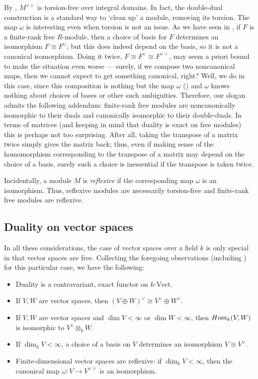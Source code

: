 By , $M^{\vee\vee}$ is
torsion-free over integral domains. In
fact, the double-dual construction is a standard way to `clean up' a
module, removing its torsion.  The map $\omega$ is interesting even
when torsion is not an issue. As we have seen in
, if $F$ is a finite-rank free $R$-module,
then a choice of basis for $F$ determines an isomorphism
$F \cong F^\vee$; but this does indeed depend on the basis, so it is
not a canonical isomorphism. Doing it twice,
$F \cong F^\vee \cong F^{\vee\vee}$, may seem a priori bound to make
the situation even worse --- surely, if we compose two noncanonical
maps, then we cannot expect to get something canonical, right? Well,
we do in this case, since this composition is nothing but the map
$\omega$
()
and $\omega$ knows nothing about choices of bases or other such
ambiguities. Therefore, our slogan admits the following addendum:
finite-rank free modules are noncanonically isomorphic to their duals
and canonically isomorphic to their double-duals.  In terms of
matrices (and keeping in mind that duality is exact on free modules)
this is perhaps not too surprising. After all, taking the transpose of
a matrix twice simply gives the matrix back; thus, even if making
sense of the homomorphism corresponding to the transpose of a matrix
may depend on the choice of a basis, surely such a choice is
inessential if the transpose is taken twice.

Incidentally, a module $M$ is \emph{reflexive} if the corresponding
map $\omega$ is an isomorphism. Thus, reflexive modules are
necessarily torsion-free and finite-rank free modules are reflexive.

\subsection{Duality on vector spaces}
\label{subsec:linrep:duality-on-vector-spaces}
In all these considerations, the case of vector spaces over a field
$k$ is only special in that vector spaces are free. Collecting the
foregoing observations (including
) for this
particular case, we have the following:
\begin{itemize}
\item Duality is a contravariant, exact functor on $k\text{-Vect}$.
\item If $V, W$ are vector spaces, then
  $(V \oplus W)^\vee \cong V^\vee \oplus W^\vee$.
\item If $V, W$ are vector spaces and $\dim V < \infty$ or
  $\dim W < \infty$, then $Hom_k(V,W)$ is isomorphic to
  $V^\vee \otimes_k W$.
\item If $\dim_k V < \infty$, a choice of a basis on $V$ determines an
  isomorphism $V \cong V^\vee$.
\item Finite-dimensional vector spaces are reflexive: if
  $\dim_k V < \infty$, then the canonical map
  $\omega : V \to V^{\vee\vee}$ is an isomorphism.
\end{itemize}

